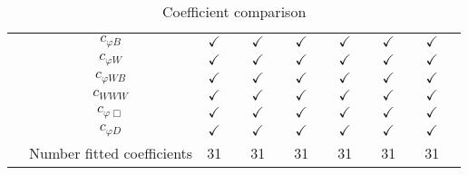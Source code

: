 \documentclass{article}
\begin{document}
\begin{table}[H]
\begin{tabular}{|c|c|c|c|c|c|c|c|c|c|c|c|c|c|}
 & $c_{\varphi B}$ & $\checkmark$ &  & $\checkmark$ &  & $\checkmark$ &  & $\checkmark$ &  & $\checkmark$ &  & $\checkmark$ & \\ \cline{2-14}
 & $c_{\varphi W}$ & $\checkmark$ &  & $\checkmark$ &  & $\checkmark$ &  & $\checkmark$ &  & $\checkmark$ &  & $\checkmark$ & \\ \cline{2-14}
 & $c_{\varphi WB}$ & $\checkmark$ &  & $\checkmark$ &  & $\checkmark$ &  & $\checkmark$ &  & $\checkmark$ &  & $\checkmark$ & \\ \cline{2-14}
 & $c_{WWW}$ & $\checkmark$ &  & $\checkmark$ &  & $\checkmark$ &  & $\checkmark$ &  & $\checkmark$ &  & $\checkmark$ & \\ \cline{2-14}
 & $c_{\varphi \Box}$ & $\checkmark$ &  & $\checkmark$ &  & $\checkmark$ &  & $\checkmark$ &  & $\checkmark$ &  & $\checkmark$ & \\ \cline{2-14}
 & $c_{\varphi D}$ & $\checkmark$ &  & $\checkmark$ &  & $\checkmark$ &  & $\checkmark$ &  & $\checkmark$ &  & $\checkmark$ &
\\ \hline
\hline & Number fitted coefficients & 31 &  & 31 &  & 31 &  & 31 &  & 31 &  & 31 &  \\ \hline
\end{tabular}
\caption{Coefficient comparison}
\end{table}
\end{document}
